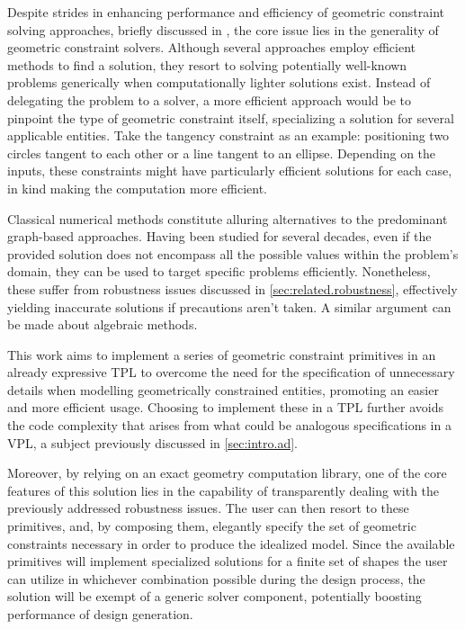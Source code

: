 %
\label{chap:solution}
\cleardoublepage{}


\noindent
Despite strides in enhancing performance and efficiency of geometric constraint
solving approaches, briefly discussed in , the core
issue lies in the generality of geometric constraint solvers.  Although several
approaches employ efficient methods to find a solution, they resort to solving
potentially well-known problems generically when computationally lighter
solutions exist.  Instead of delegating the problem to a solver, a more
efficient approach would be to pinpoint the type of geometric constraint itself,
specializing a solution for several applicable entities.  Take the tangency
constraint as an example: positioning two circles tangent to each other or a
line tangent to an ellipse.  Depending on the inputs, these constraints might
have particularly efficient solutions for each case, in kind making the
computation more efficient.

Classical numerical methods constitute alluring alternatives to the predominant
graph-based approaches.  Having been studied for several decades, even if the
provided solution does not encompass all the possible values within the
problem's domain, they can be used to target specific problems efficiently.
Nonetheless, these suffer from robustness issues discussed in
\cref{sec:related.robustness}, effectively yielding inaccurate solutions if
precautions aren't taken.  A similar argument can be made about algebraic
methods.

This work aims to implement a series of geometric constraint primitives in an
already expressive \ac{TPL} to overcome the need for the specification of
unnecessary details when modelling geometrically constrained entities, promoting
an easier and more efficient usage.  Choosing to implement these in a \ac{TPL}
further avoids the code complexity that arises from what could be analogous
specifications in a \ac{VPL}, a subject previously discussed in
\cref{sec:intro.ad}.

Moreover, by relying on an exact geometry computation library, one of the core
features of this solution lies in the capability of transparently dealing with
the previously addressed robustness issues.  The user can then resort to these
primitives, and, by composing them, elegantly specify the set of geometric
constraints necessary in order to produce the idealized model.  Since the
available primitives will implement specialized solutions for a finite set of
shapes the user can utilize in whichever combination possible during the design
process, the solution will be exempt of a generic solver component, potentially
boosting performance of design generation.

